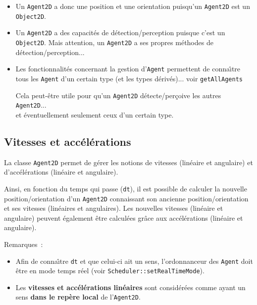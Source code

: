 \documentclass[12pt]{article}
\begin{document}
\begin{itemize}
\item Un {\tt Agent2D} a donc une position et une orientation puisqu'un
{\tt Agent2D} est un {\tt Object2D}.

\vspace{-0.1cm}
\item Un {\tt Agent2D} a des capacit\'es de d\'etection/perception
puisque c'est un {\tt Object2D}.
Mais attention, un {\tt Agent2D} a ses propres m\'ethodes de
d\'etection/perception...

\vspace{-0.1cm}
\item Les fonctionnalit\'es concernant la gestion d'{\tt Agent}
permettent de conna\^ \i tre tous les {\tt Agent} d'un certain type
(et les types d\'eriv\'es)... voir {\tt getAllAgents}


\noindent
Cela peut-\^etre utile pour qu'un {\tt Agent2D} d\'etecte/per\c coive
les autres {\tt Agent2D}...\\ et
\'eventuellement seulement ceux d'un certain type.
\end{itemize}

\subsection{Vitesses et acc\'el\'erations}

\vspace{0.2cm}
La classe {\tt Agent2D} permet de g\'erer les notions de vitesses
(lin\'eaire et angulaire) et d'acc\'el\'erations (lin\'eaire et angulaire).

\vspace{0.2cm}
Ainsi, en fonction du temps qui passe ({\tt dt}), il
est possible de calculer la nouvelle position/orientation
d'un {\tt Agent2D} connaissant son ancienne position/orientation et ses
vitesses (lin\'eaires et angulaires).
Les nouvelles vitesses (lin\'eaire et angulaire) peuvent \'egalement
\^etre calcul\'ees gr\^ace aux acc\'el\'erations (lin\'eaire et angulaire).

\vspace{0.2cm}
Remarques~:
\begin{itemize}
\item Afin de conna\^ \i tre {\tt dt} et que celui-ci ait un sens,
l'ordonnanceur des {\tt Agent} doit \^etre en mode temps r\'eel
(voir {\tt Scheduler::setRealTimeMode}).
\vspace{-0.1cm}
\item Les {\bf vitesses et acc\'el\'erations lin\'eaires} sont consid\'er\'ees
comme ayant un sens {\bf dans le rep\`ere local} de l'{\tt Agent2D}.
\end{itemize}
\end{document}
